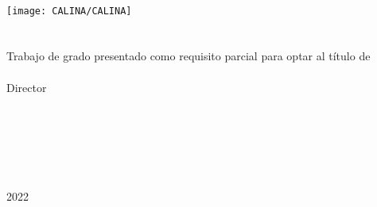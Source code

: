 \begin{center}

\hfill\\

\vspace{2cm}
\texttt{[image: CALINA/CALINA]}\\
\titulotesis\\
\vspace{3cm}
\autordeldocumento\\
\vspace{2cm}
Trabajo de grado presentado como requisito parcial para optar al título de\\
\tituloaobtener\\
\vspace{2cm}
Director\\
\asesordeldocumento\\
\titulodelasesor\\
\vspace{2cm}
\nombreuniversidad\\
\departamentouniversidad\\
\nombrefacultad\\
\localizacionuniversidad\\
2022
\end{center}
